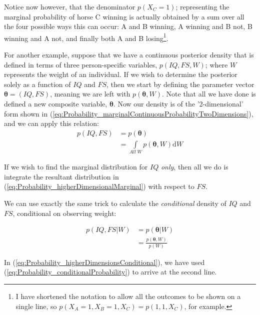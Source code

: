 \documentclass[11pt,fullpage]{book}
\begin{document}
Notice now however, that the denominator $p(X_C=1)$; representing the marginal probability of horse C winning is actually obtained by a sum over all the four possible ways this can occur: A and B winning, A winning and B not, B winning and A not, and finally both A and B losing\footnote{I have shortened the notation to allow all the outcomes to be shown on a single line, so $p(X_A=1,X_B=1,X_C)=p(1,1,X_C)$, for example.}.

For another example, suppose that we have a continuous posterior density that is defined in terms of three person-specific variables, $p(IQ,FS,W)$; where $W$ represents the weight of an individual. If we wish to determine the posterior solely as a function of $IQ$ and $FS$, then we start by defining the parameter vector $\boldsymbol{\theta} = (IQ,FS)$, meaning we are left with $p(\boldsymbol{\theta},W)$. Note that all we have done is defined a new composite variable, $\boldsymbol{\theta}$. Now our density is of the '2-dimensional' form shown in (\ref{eq:Probability_marginalContinuousProbabilityTwoDimensions}), and we can apply this relation:\\

\begin{equation}\label{eq:Probability_higherDimensionalMarginal}
\begin{align}
p(IQ,FS) &= p(\boldsymbol{\theta})\\
&= \int\limits_{All\; W} p(\boldsymbol{\theta},W)\mathrm{d}W
\end{align}
\end{equation}

If we wish to find the marginal distribution for $IQ$ \textit{only}, then all we do is integrate the resultant distribution in (\ref{eq:Probability_higherDimensionalMarginal}) with respect to $FS$.

We can use exactly the same trick to calculate the \textit{conditional} density of $IQ$ and $FS$, conditional on observing weight:

\begin{equation}\label{eq:Probability_higherDimensionsConditional}
\begin{align}
p(IQ,FS|W) &= p(\boldsymbol{\theta}|W)\\
&= \frac{p(\boldsymbol{\theta},W)}{p(W)}
\end{align}
\end{equation}

In (\ref{eq:Probability_higherDimensionsConditional}), we have used (\ref{eq:Probability_conditionalProbability}) to arrive at the second line.
\end{document}
